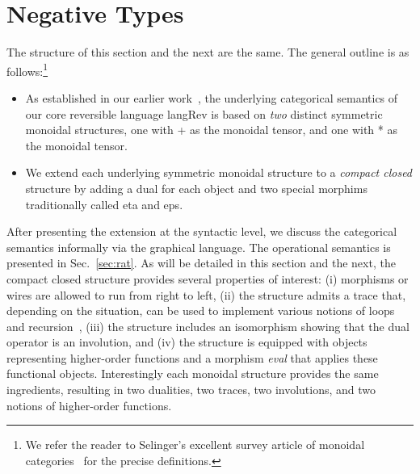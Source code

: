 \documentclass[preprint]{sigplanconf}
\newcommand{\xcomment}[2]{\textbf{#1:~\textsl{#2}}}
\newcommand{\roshan}[1]{\xcomment{Roshan}{#1}}
\newtheorem{proposition}[theorem]{Proposition}
\begin{document}



\section{Negative Types}
\label{sec:neg}

The structure of this section and the next are the same. The general outline
is as follows:\footnote{We refer the reader to Selinger's excellent survey
  article of monoidal
  categories~\cite{springerlink:10.1007/978-3-642-12821-94} for the precise
  definitions.}
\begin{itemize}
\item As established in our earlier work~\cite{rc2011,infeffects}, the
  underlying categorical semantics of our core reversible language
  {{langRev}} is based on \emph{two} distinct symmetric monoidal structures,
  one with {{+}} as the monoidal tensor, and one with {{*}} as the monoidal
  tensor.
\item We extend each underlying symmetric monoidal structure to a
  \emph{compact closed} structure by adding a dual for each object and two
  special morphims traditionally called {{eta}} and {{eps}}. 
\end{itemize}
After presenting the extension at the syntactic level, we discuss the
categorical semantics informally via the graphical language. The operational
semantics is presented in Sec.~\ref{sec:rat}. As will be detailed in this
section and the next, the compact closed structure provides several
properties of interest: (i) morphisms or wires are allowed to run from right
to left, (ii) the structure admits a trace that, depending on the situation,
can be used to implement various notions of loops and
recursion~\cite{joyal1996traced,Hasegawa:2009:TMC:1552068.1552069,Hasegawa:1997:RCS:645893.671607},
(iii) the structure includes an isomorphism showing that the dual operator is
an involution, and (iv) the structure is equipped with objects representing
higher-order functions and a morphism \textit{eval} that applies these
functional objects. Interestingly each monoidal structure provides the same
ingredients, resulting in two dualities, two traces, two involutions, and two
notions of higher-order functions.
\end{document}
